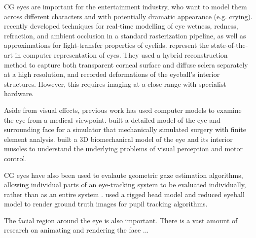 

CG eyes are important for the entertainment industry, who want to model them across different characters and with potentially dramatic appearance (e.g. crying).
\citet{ActiBlizEyes} recently developed techniques for real-time modelling of eye wetness, redness, refraction, and ambient occlusion in a standard rasterization pipeline, as well as approximations for light-transfer properties of eyelids.
\citet{berard2014highquality} represent the state-of-the-art in computer representation of eyes.
They used a hybrid reconstruction method to capture both transparent corneal surface and diffuse sclera separately at a high resolution, and recorded deformations of the eyeball's interior structures.
However, this requires imaging at a close range with specialist hardware.

Aside from visual effects, previous work has used computer models to examine the eye from a medical viewpoint.
\citet{sagar1994virtual} built a detailed model of the eye and surrounding face for a simulator that mechanically simulated surgery with finite element analysis.
\citet{priamikov14_openeyesim} built a 3D biomechanical model of the eye and its interior muscles to understand the underlying problems of visual perception and motor control. 
 
CG eyes have also been used to evalaute geometric gaze estimation algorithms, allowing individual parts of an eye-tracking system to be evaluated individually, rather than as an entire system \cite{bohme2008software,swirski2014rendering}. \citet{swirski2014rendering} used a rigged head model and reduced eyeball model to render ground truth images for pupil tracking algorithms.

The facial region around the eye is also important. There is a vast amount of research on animating and rendering the face ... \cite{orvalho2012facial}



